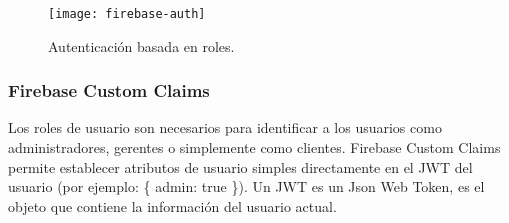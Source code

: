 \begin{figure}[H]
  \centering
  \texttt{[image: firebase-auth]}
  \caption{Autenticación basada en roles.}
\end{figure}

\subsubsection{Firebase Custom Claims}
Los roles de usuario son necesarios para identificar a los usuarios como administradores, gerentes o simplemente como clientes. Firebase Custom Claims permite establecer atributos de usuario simples directamente en el JWT del usuario (por ejemplo: \{ admin: true \}). Un JWT es un Json Web Token, es el objeto que contiene la información del usuario actual.
\vspace{0.8cm}

